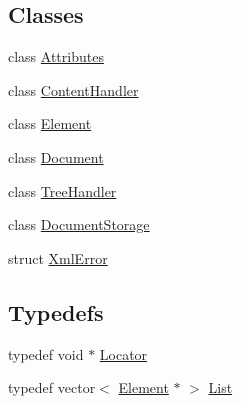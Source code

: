 \subsection*{Classes}
\begin{DoxyCompactItemize}
\item 
class \mbox{\hyperlink{class_attributes}{Attributes}}
\item 
class \mbox{\hyperlink{class_content_handler}{Content\+Handler}}
\item 
class \mbox{\hyperlink{class_element}{Element}}
\item 
class \mbox{\hyperlink{class_document}{Document}}
\item 
class \mbox{\hyperlink{class_tree_handler}{Tree\+Handler}}
\item 
class \mbox{\hyperlink{class_document_storage}{Document\+Storage}}
\item 
struct \mbox{\hyperlink{struct_xml_error}{Xml\+Error}}
\end{DoxyCompactItemize}
\subsection*{Typedefs}
\begin{DoxyCompactItemize}
\item 
typedef void $\ast$ \mbox{\hyperlink{xml_8hh_ad34bc338f5e298a1993320898263b741}{Locator}}
\item 
typedef vector$<$ \mbox{\hyperlink{class_element}{Element}} $\ast$ $>$ \mbox{\hyperlink{xml_8hh_ab5ab62f46b3735557c125f91b40ac155}{List}}
\end{DoxyCompactItemize}
